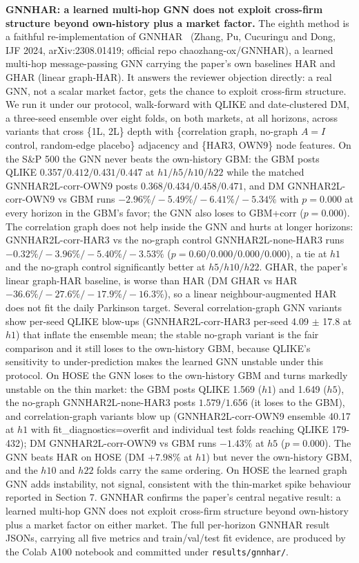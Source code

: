 \documentclass{llncs}
\begin{document}
\textbf{GNNHAR: a learned multi-hop GNN does not exploit cross-firm structure beyond own-history plus a market factor.}
The eighth method is a faithful re-implementation of GNNHAR~\cite{gnnhar} (Zhang, Pu, Cucuringu and Dong, IJF 2024,
arXiv:2308.01419; official repo chaozhang-ox/GNNHAR), a learned multi-hop message-passing GNN carrying the
paper's own baselines HAR and GHAR (linear graph-HAR). It answers the reviewer objection directly: a real GNN,
not a scalar market factor, gets the chance to exploit cross-firm structure. We run it under our protocol,
walk-forward with QLIKE and date-clustered DM, a three-seed ensemble over eight folds, on both markets, at all
horizons, across variants that cross \{1L, 2L\} depth with \{correlation graph, no-graph $A=I$ control, random-edge
placebo\} adjacency and \{HAR3, OWN9\} node features. On the S\&P 500 the GNN never beats the own-history GBM: the
GBM posts QLIKE $0.357/0.412/0.431/0.447$ at $h1/h5/h10/h22$ while the matched GNNHAR2L-corr-OWN9 posts
$0.368/0.434/0.458/0.471$, and DM GNNHAR2L-corr-OWN9 vs GBM runs $-2.96\%/-5.49\%/-6.41\%/-5.34\%$ with $p=0.000$ at every
horizon in the GBM's favor; the GNN also loses to GBM+corr ($p=0.000$). The correlation graph does not help inside
the GNN and hurts at longer horizons: GNNHAR2L-corr-HAR3 vs the no-graph control GNNHAR2L-none-HAR3 runs
$-0.32\%/-3.96\%/-5.40\%/-3.53\%$ ($p=0.60/0.000/0.000/0.000$), a tie at $h1$ and the no-graph control significantly better
at $h5/h10/h22$. GHAR, the paper's linear graph-HAR baseline, is worse than HAR (DM GHAR vs HAR
$-36.6\%/-27.6\%/-17.9\%/-16.3\%$), so a linear neighbour-augmented HAR does not fit the daily Parkinson target.
Several correlation-graph GNN variants show per-seed QLIKE blow-ups (GNNHAR2L-corr-HAR3 per-seed 4.09 $\pm$ 17.8 at
$h1$) that inflate the ensemble mean; the stable no-graph variant is the fair comparison and it still loses to the
own-history GBM, because QLIKE's sensitivity to under-prediction makes the learned GNN unstable under this
protocol. On HOSE the GNN loses to the own-history GBM and turns markedly unstable on the thin market: the GBM
posts QLIKE 1.569 ($h1$) and 1.649 ($h5$), the no-graph GNNHAR2L-none-HAR3 posts $1.579/1.656$ (it loses to the GBM),
and correlation-graph variants blow up (GNNHAR2L-corr-OWN9 ensemble 40.17 at $h1$ with fit\_diagnostics=overfit and
individual test folds reaching QLIKE 179-432); DM GNNHAR2L-corr-OWN9 vs GBM runs $-1.43\%$ at $h5$ ($p=0.000$). The GNN
beats HAR on HOSE (DM $+7.98\%$ at $h1$) but never the own-history GBM, and the $h10$ and $h22$ folds carry the same
ordering. On HOSE the learned graph GNN adds instability, not signal, consistent with the thin-market spike
behaviour reported in Section 7. GNNHAR confirms the paper's central negative result: a learned multi-hop GNN does
not exploit cross-firm structure beyond own-history plus a market factor on either market. The full per-horizon
GNNHAR result JSONs, carrying all five metrics and train/val/test fit evidence, are produced by the Colab A100
notebook and committed under \texttt{results/gnnhar/}.
\end{document}

